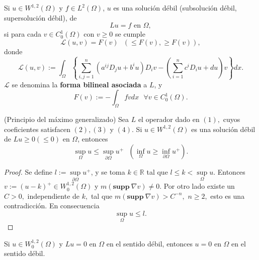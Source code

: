 \begin{definition}
Si $u\in W^{1,2}(\Omega)$ y $f\in L^{2}\left(  \Omega\right)  $, $u$ es una
soluci\'{o}n d\'{e}bil (subsoluci\'{o}n d\'{e}bil, supersoluci\'{o}n
d\'{e}bil), de
\[
Lu=f\text{ \ \ en }\Omega,
\]
si para cada $v\in C_{0}^{1}\left(  \Omega\right)  $ con $v\geq0$ se cumple
\begin{equation}
\mathcal{L}\left(  u,v\right)  =F\left(  v\right)  \text{ \ }\left(  \leq
F\left(  v\right)  ,\geq F\left(  v\right)  \right)  ,\tag{5}%
\end{equation}
donde
\begin{equation}
\mathcal{L}\left(  u,v\right)  :=\int_{\Omega}\left\{  \sum_{i,j=1}^{n}\left(
a^{ij}D_{j}u+b^{i}u\right)  D_{i}v-\left(  \sum_{i=1}^{n}c^{i}D_{i}%
u+du\right)  v\right\}  dx.\tag{6}%
\end{equation}
$\mathcal{L}$ se denomina la \textbf{forma bilineal asociada} a $L$, y
\begin{equation}
F\left(  v\right)  :=-\int_{\Omega}fvdx\text{ \ }\forall v\in C_{0}^{1}\left(
\Omega\right)  .\tag{7}%
\end{equation}
\end{definition}

\begin{theorem}
(Principio del m\'{a}ximo generalizado) Sea $L$ el operador dado en $(1),$
cuyos coeficientes satisfacen $\left(  2\right)  ,\left(  3\right)  $ y
$\left(  4\right)  $. Si $u\in W^{1,2}\left(  \Omega\right)  $ es una
soluci\'{o}n d\'{e}bil de $Lu\geq0\left(  \leq0\right)  $ en $\Omega$,
entonces
\[
\sup_{\Omega}u\leq\sup_{\partial\Omega}u^{+}\text{ \ }\left(  \inf_{\Omega
}u\geq\inf_{\partial\Omega}u^{+}\right)  .
\]
\end{theorem}

\begin{proof}
Se define $l:=\sup\limits_{\partial\Omega}u^{+}$, y se toma $k\in\mathbb{R}$
tal que $l\leq k<\sup\limits_{\Omega}u$. Entonces $v:=\left(  u-k\right)
^{+}\in W_{0}^{1,2}\left(  \Omega\right)  $ y $m(\mathbf{supp\ }\nabla
v)\neq0.$ Por otro lado existe un $C>0,$ independiente de $k,$ tal que
$m(\mathbf{supp\ }\nabla v)>C^{-n},$ $n\geq2,$ esto es una contradicci\'{o}n.
En consecuencia
\[
\sup_{\Omega}u\leq l\text{.}%
\]
\end{proof}

\begin{corollary}
Si $u\in W_{0}^{1,2}\left(  \Omega\right)  $ y $Lu=0$ en $\Omega$ en el
sentido d\'{e}bil, entonces $u=0$ en $\Omega$ en el sentido d\'{e}bil.
\end{corollary}
